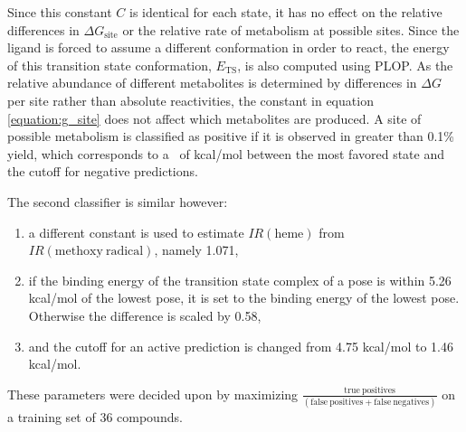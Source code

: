 
Since this constant $C$ is identical for each state, it has no effect on the relative differences in ${\Delta}G_{\mathrm{site}}$ or the relative rate of metabolism at possible sites.
Since the ligand is forced to assume a different conformation in order to react, the energy of this transition state conformation, $E_{\mathrm{TS}}$, is also computed using PLOP.
As the relative abundance of different metabolites is determined by differences in ${\Delta}G$ per site rather than absolute reactivities, the constant in equation \ref{equation:g_site} does not affect which metabolites are produced.
A site of possible metabolism is classified as positive if it is observed in greater than 0.1\% yield, which corresponds to a \ddg\ of  kcal/mol between the most favored state and the cutoff for negative predictions. 

The second classifier is similar however:
\begin{enumerate}
\item a different constant is used to estimate $IR(\mathrm{heme})$ from $IR(\mathrm{methoxy\ radical})$, namely 1.071,
\item if the binding energy of the transition state complex of a pose is within 5.26 kcal/mol of the lowest pose, it is set to the binding energy of the lowest pose.
Otherwise the difference is scaled by 0.58,
\item and the cutoff for an active prediction is changed from 4.75 kcal/mol to 1.46 kcal/mol.
\end{enumerate}
These parameters were decided upon by maximizing $\frac{\mathrm{true\ positives}}{(\mathrm{false\ positives + false\ negatives})}$ on a training set of 36 compounds.
